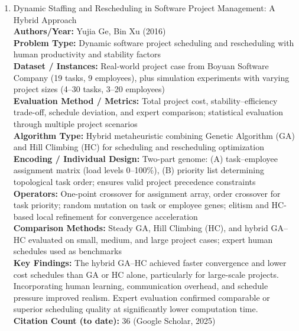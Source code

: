 \documentclass[a4paper,12pt]{article}
\begin{document}
\begin{enumerate}[leftmargin=2em, labelwidth=1em, labelsep=0.5em, itemsep=1ex]
    \item Dynamic Staffing and Rescheduling in Software Project Management: A Hybrid Approach \\
    \textbf{Authors/Year:} Yujia Ge, Bin Xu (2016) \\  
    \textbf{Problem Type:} Dynamic software project scheduling and rescheduling with human productivity and stability factors \\  
    \textbf{Dataset / Instances:} Real-world project case from Boyuan Software Company (19 tasks, 9 employees), plus simulation experiments with varying project sizes (4–30 tasks, 3–20 employees) \\  
    \textbf{Evaluation Method / Metrics:} Total project cost, stability–efficiency trade-off, schedule deviation, and expert comparison; statistical evaluation through multiple project scenarios \\  
    \textbf{Algorithm Type:} Hybrid metaheuristic combining Genetic Algorithm (GA) and Hill Climbing (HC) for scheduling and rescheduling optimization \\  
    \textbf{Encoding / Individual Design:} Two-part genome: (A) task–employee assignment matrix (load levels 0–100\%), (B) priority list determining topological task order; ensures valid project precedence constraints \\  
    \textbf{Operators:} One-point crossover for assignment array, order crossover for task priority; random mutation on task or employee genes; elitism and HC-based local refinement for convergence acceleration \\  
    \textbf{Comparison Methods:} Steady GA, Hill Climbing (HC), and hybrid GA–HC evaluated on small, medium, and large project cases; expert human schedules used as benchmarks \\  
    \textbf{Key Findings:} The hybrid GA–HC achieved faster convergence and lower cost schedules than GA or HC alone, particularly for large-scale projects. Incorporating human learning, communication overhead, and schedule pressure improved realism. Expert evaluation confirmed comparable or superior scheduling quality at significantly lower computation time. \\  
    \textbf{Citation Count (to date):} 36 (Google Scholar, 2025) \\[2ex]
  

\end{enumerate}
\end{document}
